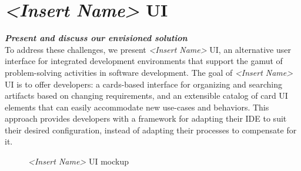 \documentclass{ppig}
\newcommand{\nameUI}{\textit{<Insert Name>} UI}
\newcommand{\bold}[1]{\textit{\textbf{\color{aoblue}#1}}}
\begin{document}
\section{\nameUI{}}
\bold{Present and discuss our envisioned solution\\}
To address these challenges, we present \nameUI{}, an alternative user interface for integrated development environments that support the gamut of problem-solving activities in software development.
The goal of \nameUI{} is to offer developers: a cards-based interface for organizing and searching artifacts based on changing requirements, and an extensible catalog of card UI elements that can easily accommodate new use-cases and behaviors.
This approach provides developers with a framework for adapting their IDE to suit their desired configuration, instead of adapting their processes to compensate for it.
\begin{figure}[h!]
	\caption{\nameUI{} mockup}
	\label{mockup}
	\vspace*{-1.5\baselineskip}
\end{figure}
\end{document}
